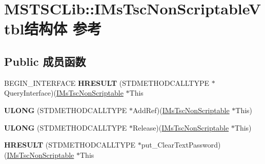 \hypertarget{struct_m_s_t_s_c_lib_1_1_i_ms_tsc_non_scriptable_vtbl}{}\section{M\+S\+T\+S\+C\+Lib\+:\+:I\+Ms\+Tsc\+Non\+Scriptable\+Vtbl结构体 参考}
\label{struct_m_s_t_s_c_lib_1_1_i_ms_tsc_non_scriptable_vtbl}
\subsection*{Public 成员函数}
\begin{DoxyCompactItemize}
\item 
\mbox{\label{struct_m_s_t_s_c_lib_1_1_i_ms_tsc_non_scriptable_vtbl_aca0b0fbaca451bea0a01fbb281848a13}} 
B\+E\+G\+I\+N\+\_\+\+I\+N\+T\+E\+R\+F\+A\+CE {\bfseries H\+R\+E\+S\+U\+LT} (S\+T\+D\+M\+E\+T\+H\+O\+D\+C\+A\+L\+L\+T\+Y\+PE $\ast$Query\+Interface)(\hyperlink{interface_m_s_t_s_c_lib_1_1_i_ms_tsc_non_scriptable}{I\+Ms\+Tsc\+Non\+Scriptable} $\ast$This
\item 
\mbox{\label{struct_m_s_t_s_c_lib_1_1_i_ms_tsc_non_scriptable_vtbl_aa50a4ce57bf9b520122d60810a26a685}} 
{\bfseries U\+L\+O\+NG} (S\+T\+D\+M\+E\+T\+H\+O\+D\+C\+A\+L\+L\+T\+Y\+PE $\ast$Add\+Ref)(\hyperlink{interface_m_s_t_s_c_lib_1_1_i_ms_tsc_non_scriptable}{I\+Ms\+Tsc\+Non\+Scriptable} $\ast$This)
\item 
\mbox{\label{struct_m_s_t_s_c_lib_1_1_i_ms_tsc_non_scriptable_vtbl_a38ce0061896e04f91f2aa57c5ec325d1}} 
{\bfseries U\+L\+O\+NG} (S\+T\+D\+M\+E\+T\+H\+O\+D\+C\+A\+L\+L\+T\+Y\+PE $\ast$Release)(\hyperlink{interface_m_s_t_s_c_lib_1_1_i_ms_tsc_non_scriptable}{I\+Ms\+Tsc\+Non\+Scriptable} $\ast$This)
\item 
\mbox{\label{struct_m_s_t_s_c_lib_1_1_i_ms_tsc_non_scriptable_vtbl_aabc9ac8ceda61b308413dc76cf09244d}} 
{\bfseries H\+R\+E\+S\+U\+LT} (S\+T\+D\+M\+E\+T\+H\+O\+D\+C\+A\+L\+L\+T\+Y\+PE $\ast$put\+\_\+\+Clear\+Text\+Password)(\hyperlink{interface_m_s_t_s_c_lib_1_1_i_ms_tsc_non_scriptable}{I\+Ms\+Tsc\+Non\+Scriptable} $\ast$This

\end{DoxyCompactItemize}
